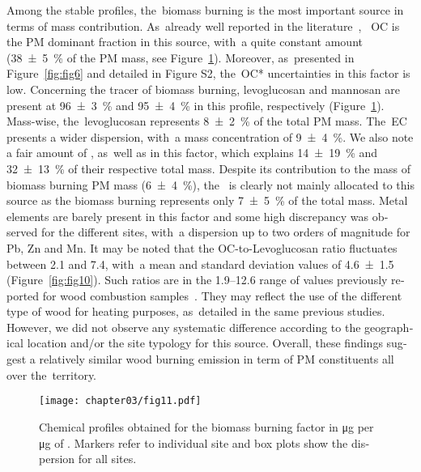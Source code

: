 \begin{otherlanguage}{english}
Among the stable profiles, the~biomass burning is the most important source in terms of
mass contribution. As~already well reported in the
literature~\autocite{schauerMeasurement2001, schmidlChemical2008, belisCritical2013},  ~OC
is the PM dominant fraction in this source, with~a quite constant amount
(\SI{38\pm5}{\percent} of the PM mass, see Figure~\ref{fig:fig11}). Moreover, as~presented
in Figure~\ref{fig:fig6} and detailed in Figure S2, the~OC* uncertainties in this factor
is low. Concerning the tracer of biomass burning,   levoglucosan and mannosan  are present
at \SI{96\pm3}{\percent} and \SI{95\pm4}{\percent} in this profile, respectively
(Figure~\ref{fig:fig11}). Mass-wise, the~levoglucosan represents \SI{8\pm2}{\percent} of
the total PM mass. The~EC presents a wider dispersion, with~a mass concentration of
\SI{9\pm4}{\percent}. We also note a fair amount of , as~well as  in this
factor, which explains \SI{14\pm19}{\percent} and \SI{32\pm13}{\percent} of their
respective total mass. Despite its contribution to the mass of biomass burning PM mass
(\SI{6\pm4}{\percent}), the~ is clearly not mainly allocated to this source as
the biomass burning represents only \SI{7\pm5}{\percent} of the total  mass.
Metal elements are barely present in this factor and some high discrepancy  was observed
for the different sites, with~a dispersion up to two orders of magnitude for Pb, Zn and
Mn.  It may be noted that the OC-to-Levoglucosan ratio fluctuates between 2.1 and 7.4,
with~a mean and standard deviation values of \num{4.6\pm1.5} (Figure~\ref{fig:fig10}).
Such ratios are in the 1.9--12.6 range of values previously reported for \PM{} wood
combustion samples~\autocite{schauerMeasurement2001, schmidlChemical2008}. They may
reflect the use of the different type of wood for heating purposes, as~detailed in the
same previous studies. However, we did not observe any systematic difference according to
the geographical location and/or the site typology for this source.  Overall, these
findings suggest a relatively similar wood burning emission in term of PM constituents all
over the~territory.

\begin{figure}[ht]
    \centering
    \texttt{[image: chapter03/fig11.pdf]}
    \caption{
        Chemical profiles obtained for the biomass burning factor in
        \si{\micro\gram} per \si{\micro\gram} of \PM. Markers refer to
        individual site and box plots show the dispersion for all sites.
    }
    \label{fig:fig11}
\end{figure}

\end{otherlanguage}
